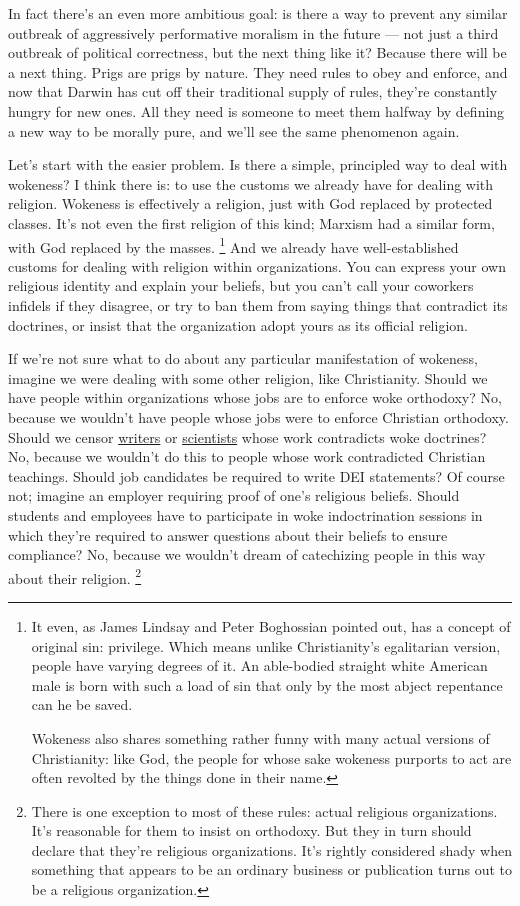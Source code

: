 \documentclass[12pt]{book}
\begin{document}
In fact there's an even more ambitious goal: is there a way to prevent
any similar outbreak of aggressively performative moralism in the future
--- not just a third outbreak of political correctness, but the next
thing like it? Because there will be a next thing. Prigs are prigs by
nature. They need rules to obey and enforce, and now that Darwin has cut
off their traditional supply of rules, they're constantly hungry for new
ones. All they need is someone to meet them halfway by defining a new
way to be morally pure, and we'll see the same phenomenon again.

Let's start with the easier problem. Is there a simple, principled way
to deal with wokeness? I think there is: to use the customs we already
have for dealing with religion. Wokeness is effectively a religion, just
with God replaced by protected classes. It's not even the first religion
of this kind; Marxism had a similar form, with God replaced by the
masses. \footnote{It even, as James Lindsay and Peter Boghossian pointed out, has
a concept of original sin: privilege. Which means unlike Christianity's
egalitarian version, people have varying degrees of it. An able-bodied
straight white American male is born with such a load of sin that only
by the most abject repentance can he be saved.

Wokeness also shares something rather funny with many actual versions of
Christianity: like God, the people for whose sake wokeness purports to
act are often revolted by the things done in their name.} And we already have well-established
customs for dealing with religion within organizations. You can express
your own religious identity and explain your beliefs, but you can't call
your coworkers infidels if they disagree, or try to ban them from saying
things that contradict its doctrines, or insist that the organization
adopt yours as its official religion.

If we're not sure what to do about any particular manifestation of
wokeness, imagine we were dealing with some other religion, like
Christianity. Should we have people within organizations whose jobs are
to enforce woke orthodoxy? No, because we wouldn't have people whose
jobs were to enforce Christian orthodoxy. Should we censor
\href{https://www.telegraph.co.uk/news/2023/02/17/roald-dahl-books-rewritten-offensive-matilda-witches-twits/}{writers}
or
\href{https://x.com/KoustaStavroula/status/1562034502897106946}{scientists}
whose work contradicts woke doctrines? No, because we wouldn't do this
to people whose work contradicted Christian teachings. Should job
candidates be required to write DEI statements? Of course not; imagine
an employer requiring proof of one's religious beliefs. Should students
and employees have to participate in woke indoctrination sessions in
which they're required to answer questions about their beliefs to ensure
compliance? No, because we wouldn't dream of catechizing people in this
way about their religion. \footnote{There is one exception to most of these rules: actual religious
organizations. It's reasonable for them to insist on orthodoxy. But they
in turn should declare that they're religious organizations. It's
rightly considered shady when something that appears to be an ordinary
business or publication turns out to be a religious organization.}
\end{document}

